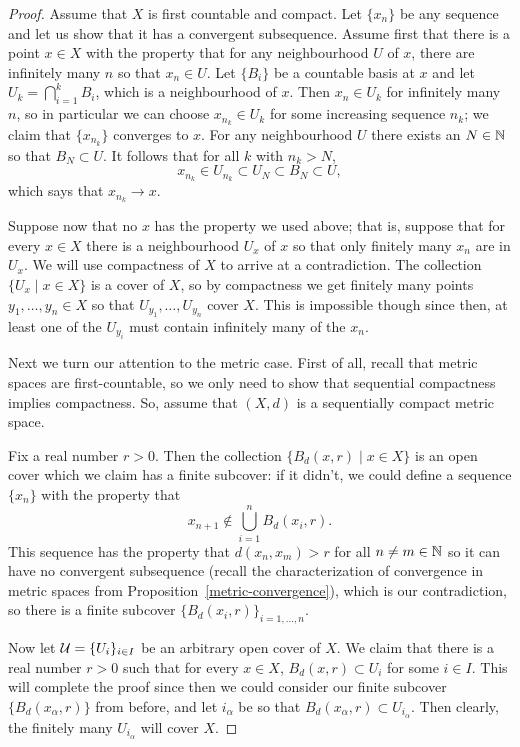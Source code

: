 \begin{proof}
  Assume that $X$ is first countable and compact. Let $\{x_n\}$ be any sequence and let us show that it has a convergent subsequence. Assume first that there is a point $x \in X$ with the property that for any neighbourhood $U$ of $x$, there are infinitely many $n$ so that $x_n \in U$. Let $\{B_i\}$ be a countable basis at $x$ and let $U_k = \bigcap_{i=1}^k B_i$, which is a neighbourhood of $x$. Then $x_n \in U_k$ for infinitely many $n$, so in particular we can choose $x_{n_k} \in U_k$ for some increasing sequence $n_k$; we claim that $\{x_{n_k}\}$ converges to $x$.  For any neighbourhood $U$ there exists an $N \in \mathbb{N}$ so that $B_N \subset U$. It follows that for all $k$ with $n_k > N$,
  \[
    x_{n_k} \in U_{n_k} \subset U_N \subset B_N \subset U,
  \]
  which says that $x_{n_k} \to x$.
  
  Suppose now that no $x$ has the property we used above; that is, suppose that for every $x \in X$ there is a neighbourhood $U_x$ of $x$ so that only finitely many $x_n$ are in $U_x$. We will use compactness of $X$ to arrive at a contradiction. The collection $\{U_x \mid x \in X\}$ is a cover of $X$, so by compactness we get finitely many points $y_1, \dots, y_n \in X$ so that $U_{y_1}, \dots, U_{y_n}$ cover $X$. This is impossible though since then, at least one of the $U_{y_i}$ must contain infinitely many of the $x_n$.
  
  Next we turn our attention to the metric case. First of all, recall that metric spaces are first-countable, so we only need to show that sequential compactness implies compactness. So, assume that $(X,d)$ is a sequentially compact metric space.
  
  Fix a real number $r > 0$. Then the collection $\{B_d(x,r) \mid x \in X\}$ is an open cover which we claim has a finite subcover: if it didn't, we could define a sequence $\{x_n\}$ with the property that
  \[
    x_{n+1} \notin \bigcup_{i=1}^n B_d(x_i,r).
  \]
  This sequence has the property that $d(x_n,x_m) > r$ for all $n \not= m \in \mathbb{N}$ so it can have no convergent subsequence (recall the characterization of convergence in metric spaces from Proposition~\ref{metric-convergence}), which is our contradiction, so there is a finite subcover $\{B_d(x_i,r)\}_{i=1,\dots,n}$.
  
  Now let $\mathcal{U} = \{U_i\}_{i \in I}$ be an arbitrary open cover of $X$. We claim that there is a real number $r > 0$ such that for every $x \in X$, $B_d(x,r) \subset U_i$ for some $i \in I$. This will complete the proof since then we could consider our finite subcover $\{B_d(x_\alpha,r)\}$ from before, and let $i_\alpha$ be so that $B_d(x_\alpha,r) \subset U_{i_\alpha}$. Then clearly, the finitely many $U_{i_\alpha}$ will cover $X$.
  

\end{proof}
